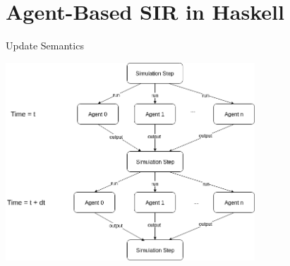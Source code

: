 \documentclass{beamer}
\begin{document}
%

%

\section{Agent-Based SIR in Haskell}
\begin{frame}{Update Semantics}


\hspace*{1cm}\includegraphics[width=0.7\textwidth]{./fig/parallel_strategy.png}\hspace*{-1cm}
\end{frame}
\end{document}
